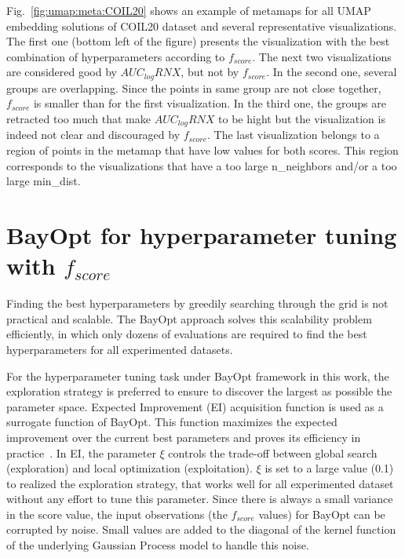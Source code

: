 Fig.~\ref{fig:umap:meta:COIL20} shows an example of metamaps for all UMAP embedding solutions of COIL20 dataset and several representative visualizations.
The first one (bottom left of the figure) presents the visualization with the best combination of hyperparameters according to $f_{score}$.
The next two visualizations are considered good by $AUC_{log}RNX$, but not by $f_{score}$.
In the second one, several groups are overlapping. Since the points in same group are not close together, $f_{score}$ is smaller than for the first visualization.
In the third one, the groups are retracted too much that make $AUC_{log}RNX$ to be hight but the visualization is indeed not clear and discouraged by $f_{score}$.
The last visualization belongs to a region of points in the metamap that have low values for both scores.
This region corresponds to the visualizations that have a too large {n\_neighbors} and/or a too large {min\_dist}. 

\section{BayOpt for hyperparameter tuning with $f_{score}$}\label{sec:apply-bayopt}

Finding the best hyperparameters by greedily searching through the grid is not practical and scalable.
The BayOpt approach solves this scalability problem efficiently, in which only dozens of evaluations are required to find the best hyperparameters for all experimented datasets.

For the hyperparameter tuning task under BayOpt framework in this work, the exploration strategy is preferred to ensure to discover the largest as possible the parameter space.
Expected Improvement (EI) acquisition function is used as a surrogate function of BayOpt.
This function maximizes the expected improvement over the current best parameters and proves its efficiency in practice~\cite{snoek2012practical}.
In EI, the parameter $\xi$ controls the trade-off between global search (exploration) and local optimization (exploitation).
$\xi$ is set to a large value (0.1) to realized the exploration strategy, that works well for all experimented dataset without any effort to tune this parameter.
Since there is always a small variance in the score value, 
the input observations (the $f_{score}$ values) for BayOpt can be corrupted by noise.
Small values are added to the diagonal of the kernel function of the underlying Gaussian Process model to handle this noise.


